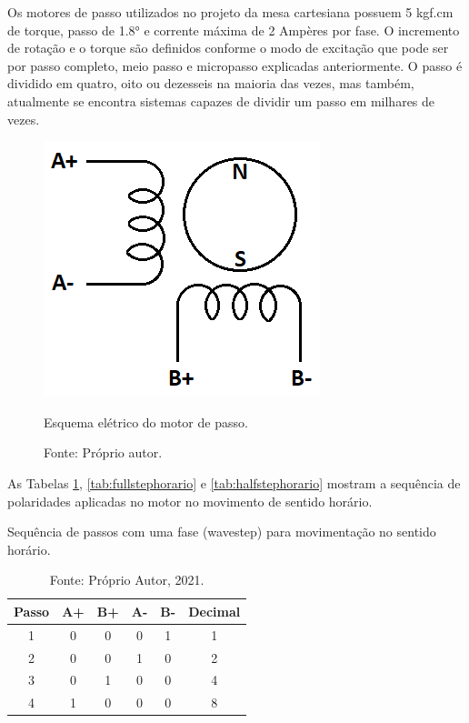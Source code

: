 Os motores de passo utilizados no projeto da mesa cartesiana possuem 5 kgf.cm de torque, passo de 1.8° e 
corrente máxima de 2 Ampères por fase. O incremento de rotação e o torque são definidos conforme o modo 
de excitação que pode ser por passo completo, meio passo e micropasso explicadas anteriormente. O passo 
é dividido em quatro, oito ou dezesseis na maioria das vezes, mas também, atualmente se encontra 
sistemas capazes de dividir um passo em milhares de vezes.

\begin{figure}[!htb]
\centering
\includegraphics[scale = 0.6]{figuras/meumotorbipolar}
\caption{Esquema elétrico do motor de passo.}
\caption*{Fonte: Próprio autor.}
\label{fig:meumotorbipolar}
\end{figure}
    
As Tabelas \ref{tab:wavestephorario}, \ref{tab:fullstephorario} e \ref{tab:halfstephorario} 
mostram a sequência de polaridades aplicadas no motor no movimento de sentido horário.

\begin{table}
    \centering
    \caption{Sequência de passos com uma fase (wavestep) para movimentação no sentido horário.}
    \begin{tabular}{cccccc}
        \hline
        \textbf{Passo} & \textbf{A+} & \textbf{B+} & \textbf{A-} & \textbf{B-} & \textbf{Decimal}\\
        \hline
        1 & 0 & 0 & 0 & 1 & 1\\
        2 & 0 & 0 & 1 & 0 & 2\\
        3 & 0 & 1 & 0 & 0 & 4\\
        4 & 1 & 0 & 0 & 0 & 8\\        
        \hline       
    \end{tabular}
    \caption*{Fonte: Próprio Autor, 2021.}
    \label{tab:wavestephorario}
\end{table}

